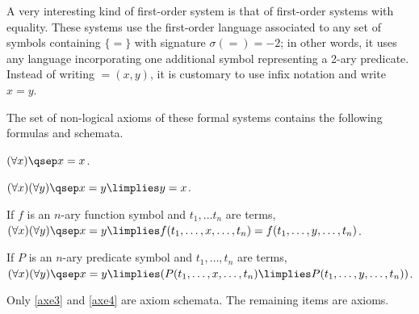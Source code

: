\begin{example}
\label{exfofs}
\begin{parlist}
\item A very interesting kind of first-order system is that of first-order systems with equality. These systems use the first-order language associated to any set of symbols containing $\{=\}$ with signature $\sigma(=) = -2$; in other words, it uses any language incorporating one additional symbol representing a 2-ary predicate. Instead of writing ${=}(x,y)$, it is customary to use infix notation and write $x=y$.

The set of non-logical axioms of these formal systems contains the following formulas and schemata.
\begin{axioms}[E]
\item $(\forall x)\qsep x = x$. \label{axe1}
\item $(\forall x)(\forall y)\qsep x = y \limplies y = x$. \label{axe2}
\item If $f$ is an $n$-ary function symbol and $t_1,\ldots t_n$ are terms, $(\forall x)(\forall y)\qsep x = y \limplies f(t_1,\ldots,x,\ldots,t_n) = f(t_1,\ldots,y,\ldots,t_n)$. \label{axe3}
\item If $P$ is an $n$-ary predicate symbol and $t_1,\ldots,t_n$ are terms, $(\forall x)(\forall y)\qsep x = y \limplies (P(t_1,\ldots,x,\ldots,t_n) \limplies P(t_1,\ldots,y,\ldots,t_n))$. \label{axe4}
\end{axioms}
Only \ref{axe3} and \ref{axe4} are axiom schemata. The remaining items are axioms.


\end{parlist}
\end{example}
